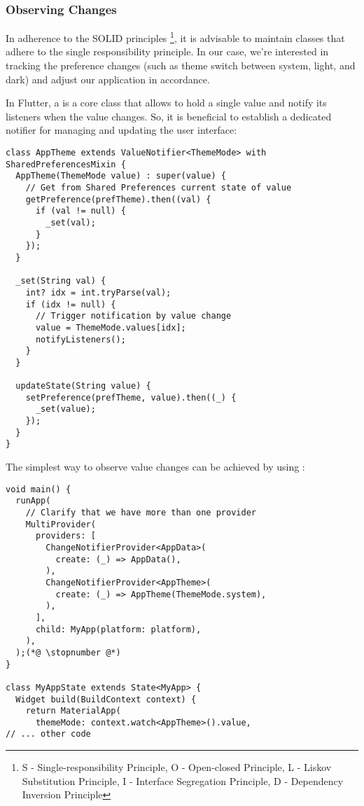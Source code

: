 \subsubsection{Observing Changes}

In adherence to the SOLID principles \footnote{S - Single-responsibility Principle, O - Open-closed Principle, L - 
Liskov Substitution Principle, I - Interface Segregation Principle, D - Dependency Inversion Principle}, it is advisable 
to maintain classes that adhere to the single responsibility principle. In our case, we're interested in tracking the 
preference changes (such as theme switch between system, light, and dark) and adjust our application in accordance.

In Flutter, a  is a core class that allows to hold a single value and notify its listeners when the 
value changes. So, it is beneficial to establish a dedicated notifier for managing and updating the user interface:

\begin{lstlisting}
class AppTheme extends ValueNotifier<ThemeMode> with SharedPreferencesMixin {
  AppTheme(ThemeMode value) : super(value) {
    // Get from Shared Preferences current state of value
    getPreference(prefTheme).then((val) {
      if (val != null) {
        _set(val);
      }
    });
  }

  _set(String val) {
    int? idx = int.tryParse(val);
    if (idx != null) {
      // Trigger notification by value change
      value = ThemeMode.values[idx];
      notifyListeners();
    }
  }

  updateState(String value) {
    setPreference(prefTheme, value).then((_) {
      _set(value);
    });
  }
}
\end{lstlisting}

\noindent The simplest way to observe value changes can be achieved by using :

\begin{lstlisting}
void main() {
  runApp(
    // Clarify that we have more than one provider
    MultiProvider(
      providers: [
        ChangeNotifierProvider<AppData>(
          create: (_) => AppData(),
        ),
        ChangeNotifierProvider<AppTheme>(
          create: (_) => AppTheme(ThemeMode.system),
        ),
      ],
      child: MyApp(platform: platform),
    ),
  );(*@ \stopnumber @*)
}

class MyAppState extends State<MyApp> {
  Widget build(BuildContext context) {
    return MaterialApp(
      themeMode: context.watch<AppTheme>().value,
// ... other code
\end{lstlisting}

